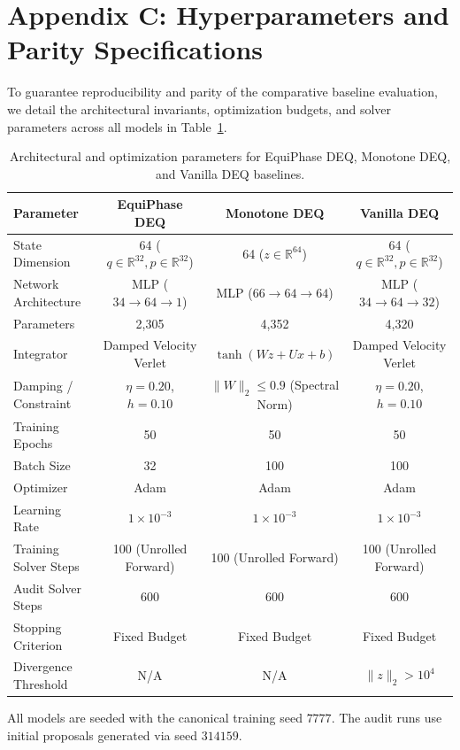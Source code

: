 \section{Appendix C: Hyperparameters and Parity Specifications}
\label{sec:appendix_c}

To guarantee reproducibility and parity of the comparative baseline evaluation, we detail the architectural invariants, optimization budgets, and solver parameters across all models in Table~\ref{tab:hyperparameters}.

\begin{table}[h]
\centering
\caption{Architectural and optimization parameters for EquiPhase DEQ, Monotone DEQ, and Vanilla DEQ baselines.}
\label{tab:hyperparameters}
\begin{tabular}{lccc}
\hline
\textbf{Parameter} & \textbf{EquiPhase DEQ} & \textbf{Monotone DEQ} & \textbf{Vanilla DEQ} \\ \hline
State Dimension & 64 ($q \in \mathbb{R}^{32}, p \in \mathbb{R}^{32}$) & 64 ($z \in \mathbb{R}^{64}$) & 64 ($q \in \mathbb{R}^{32}, p \in \mathbb{R}^{32}$) \\
Network Architecture & MLP ($34 \to 64 \to 1$) & MLP ($66 \to 64 \to 64$) & MLP ($34 \to 64 \to 32$) \\
Parameters & 2,305 & 4,352 & 4,320 \\
Integrator & Damped Velocity Verlet & $\tanh(Wz + Ux + b)$ & Damped Velocity Verlet \\
Damping / Constraint & $\eta = 0.20$, $h = 0.10$ & $\|W\|_2 \le 0.9$ (Spectral Norm) & $\eta = 0.20$, $h = 0.10$ \\
Training Epochs & 50 & 50 & 50 \\
Batch Size & 32 & 100 & 100 \\
Optimizer & Adam & Adam & Adam \\
Learning Rate & $1 \times 10^{-3}$ & $1 \times 10^{-3}$ & $1 \times 10^{-3}$ \\
Training Solver Steps & 100 (Unrolled Forward) & 100 (Unrolled Forward) & 100 (Unrolled Forward) \\
Audit Solver Steps & 600 & 600 & 600 \\
Stopping Criterion & Fixed Budget & Fixed Budget & Fixed Budget \\
Divergence Threshold & N/A & N/A & $\|z\|_2 > 10^4$ \\ \hline
\end{tabular}
\end{table}

All models are seeded with the canonical training seed $7777$. The audit runs use initial proposals generated via seed $314159$.

